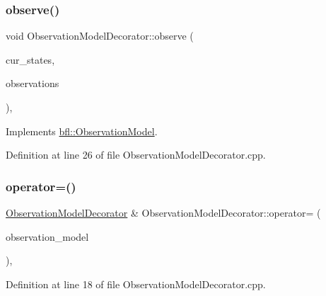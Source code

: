 \subsubsection{\texorpdfstring{observe()}{observe()}}
{\footnotesize\ttfamily void Observation\+Model\+Decorator\+::observe (\begin{DoxyParamCaption}\item[{const Eigen\+::\+Ref$<$ const Eigen\+::\+Matrix\+Xf $>$ \&}]{cur\+\_\+states,  }\item[{Eigen\+::\+Ref$<$ Eigen\+::\+Matrix\+Xf $>$}]{observations }\end{DoxyParamCaption})\hspace{0.3cm}{\ttfamily [override]}, {\ttfamily [virtual]}}



Implements \mbox{\hyperlink{classbfl_1_1ObservationModel_a2dd06fa6df453e491e1ab73e46f33d18}{bfl\+::\+Observation\+Model}}.



Definition at line 26 of file Observation\+Model\+Decorator.\+cpp.

\mbox{\label{classbfl_1_1ObservationModelDecorator_ade8f68b2598a40e9db26fcdbc0aa6638}} 
\subsubsection{\texorpdfstring{operator=()}{operator=()}}
{\footnotesize\ttfamily \mbox{\hyperlink{classbfl_1_1ObservationModelDecorator}{Observation\+Model\+Decorator}} \& Observation\+Model\+Decorator\+::operator= (\begin{DoxyParamCaption}\item[{\mbox{\hyperlink{classbfl_1_1ObservationModelDecorator}{Observation\+Model\+Decorator}} \&\&}]{observation\+\_\+model }\end{DoxyParamCaption})\hspace{0.3cm}{\ttfamily [protected]}, {\ttfamily [noexcept]}}



Definition at line 18 of file Observation\+Model\+Decorator.\+cpp.

\mbox{\label{classbfl_1_1ObservationModelDecorator_a0d6ab787754a56159e3d1bc6d56a961c}} 
